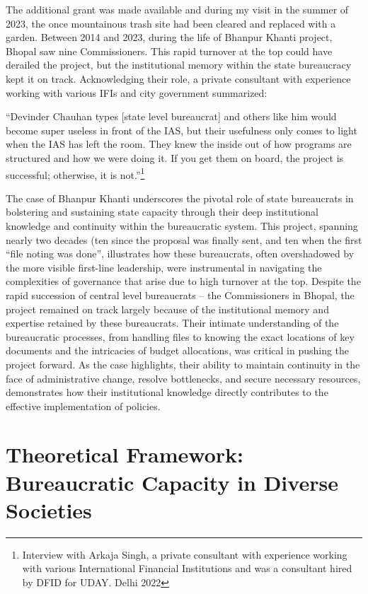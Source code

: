 The additional grant was made available and during my visit in the summer of 2023, the once mountainous trash site had been cleared and replaced with a garden. Between 2014 and 2023, during the life of Bhanpur Khanti project, Bhopal saw nine Commissioners. This rapid turnover at the top could have derailed the project, but the institutional memory within the state bureaucracy kept it on track. Acknowledging their role, a private consultant with experience working with various IFIs and city government summarized:

``Devinder Chauhan types [state level bureaucrat] and others like him would become super useless in front of the IAS, but their usefulness only comes to light when the IAS has left the room. They knew the inside out of how programs are structured and how we were doing it. If you get them on board, the project is successful; otherwise, it is not.''\footnote{Interview with Arkaja Singh, a private consultant with experience working with various International Financial Institutions and was a consultant hired by DFID for UDAY. Delhi 2022}

The case of Bhanpur Khanti underscores the pivotal role of state bureaucrats in bolstering and sustaining state capacity through their deep institutional knowledge and continuity within the bureaucratic system. This project, spanning nearly two decades (ten since the proposal was finally sent, and ten when the first ``file noting was done'', illustrates how these bureaucrats, often overshadowed by the more visible first-line leadership, were instrumental in navigating the complexities of governance that arise due to high turnover at the top. Despite the rapid succession of central level bureaucrats – the Commissioners in Bhopal, the project remained on track largely because of the institutional memory and expertise retained by these bureaucrats. Their intimate understanding of the bureaucratic processes, from handling files to knowing the exact locations of key documents and the intricacies of budget allocations, was critical in pushing the project forward. As the case highlights, their ability to maintain continuity in the face of administrative change, resolve bottlenecks, and secure necessary resources, demonstrates how their institutional knowledge directly contributes to the effective implementation of policies.

\section{Theoretical Framework: Bureaucratic Capacity in Diverse Societies}

